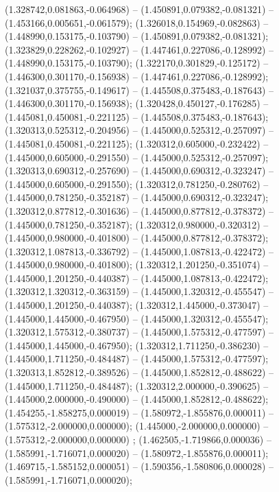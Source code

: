  (1.328742,0.081863,-0.064968) -- (1.450891,0.079382,-0.081321) -- (1.453166,0.005651,-0.061579);
 (1.326018,0.154969,-0.082863) -- (1.448990,0.153175,-0.103790) -- (1.450891,0.079382,-0.081321);
 (1.323829,0.228262,-0.102927) -- (1.447461,0.227086,-0.128992) -- (1.448990,0.153175,-0.103790);
 (1.322170,0.301829,-0.125172) -- (1.446300,0.301170,-0.156938) -- (1.447461,0.227086,-0.128992);
 (1.321037,0.375755,-0.149617) -- (1.445508,0.375483,-0.187643) -- (1.446300,0.301170,-0.156938);
 (1.320428,0.450127,-0.176285) -- (1.445081,0.450081,-0.221125) -- (1.445508,0.375483,-0.187643);
 (1.320313,0.525312,-0.204956) -- (1.445000,0.525312,-0.257097) -- (1.445081,0.450081,-0.221125);
 (1.320312,0.605000,-0.232422) -- (1.445000,0.605000,-0.291550) -- (1.445000,0.525312,-0.257097);
 (1.320313,0.690312,-0.257690) -- (1.445000,0.690312,-0.323247) -- (1.445000,0.605000,-0.291550);
 (1.320312,0.781250,-0.280762) -- (1.445000,0.781250,-0.352187) -- (1.445000,0.690312,-0.323247);
 (1.320312,0.877812,-0.301636) -- (1.445000,0.877812,-0.378372) -- (1.445000,0.781250,-0.352187);
 (1.320312,0.980000,-0.320312) -- (1.445000,0.980000,-0.401800) -- (1.445000,0.877812,-0.378372);
 (1.320312,1.087813,-0.336792) -- (1.445000,1.087813,-0.422472) -- (1.445000,0.980000,-0.401800);
 (1.320312,1.201250,-0.351074) -- (1.445000,1.201250,-0.440387) -- (1.445000,1.087813,-0.422472);
 (1.320312,1.320312,-0.363159) -- (1.445000,1.320312,-0.455547) -- (1.445000,1.201250,-0.440387);
 (1.320312,1.445000,-0.373047) -- (1.445000,1.445000,-0.467950) -- (1.445000,1.320312,-0.455547);
 (1.320312,1.575312,-0.380737) -- (1.445000,1.575312,-0.477597) -- (1.445000,1.445000,-0.467950);
 (1.320312,1.711250,-0.386230) -- (1.445000,1.711250,-0.484487) -- (1.445000,1.575312,-0.477597);
 (1.320313,1.852812,-0.389526) -- (1.445000,1.852812,-0.488622) -- (1.445000,1.711250,-0.484487);
 (1.320312,2.000000,-0.390625) -- (1.445000,2.000000,-0.490000) -- (1.445000,1.852812,-0.488622);
 (1.454255,-1.858275,0.000019) -- (1.580972,-1.855876,0.000011) -- (1.575312,-2.000000,0.000000);
 (1.445000,-2.000000,0.000000) -- (1.575312,-2.000000,0.000000) ;
 (1.462505,-1.719866,0.000036) -- (1.585991,-1.716071,0.000020) -- (1.580972,-1.855876,0.000011);
 (1.469715,-1.585152,0.000051) -- (1.590356,-1.580806,0.000028) -- (1.585991,-1.716071,0.000020);
